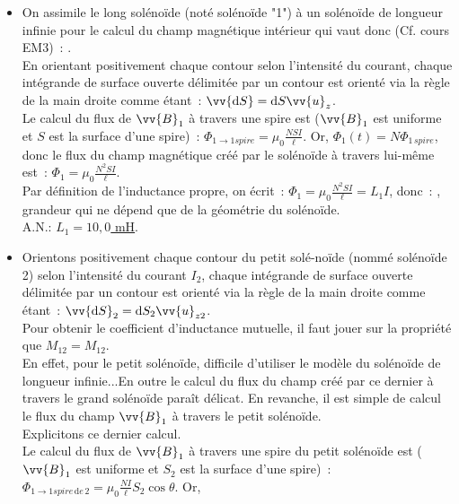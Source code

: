 \documentclass{article}
\renewcommand\overrightarrow{\vv}
\begin{document}
\begin{itemize}
\item On assimile le long solénoïde (noté solénoïde "1") à un
solénoïde de longueur infinie pour le calcul du champ magnétique
intérieur qui vaut donc (Cf. cours EM3) :
\fbox{$\overrightarrow{B}_{1} = \mu_{0}\frac{ N
I}{\ell}\overrightarrow{u}_{z}$}. \\
En orientant positivement chaque contour selon l'intensité du
courant, chaque intégrande de surface ouverte délimitée par un
contour est orienté via la règle de la main droite comme étant :
$\overrightarrow{\mathrm{d}S} =\mathrm{d}S\overrightarrow{u}_{z}$. \\
Le calcul du flux de $\overrightarrow{B}_{1}$ à travers une spire
est  ($\overrightarrow{B}_{1}$ est uniforme et $S$ est la surface
d'une spire) : $\Phi_{1\longrightarrow 1 spire} =
\mu_{0}\frac{NSI}{\ell}$. Or, $\Phi_{1}\left(t\right) = N\Phi_{1\,spire}$, donc
le flux du champ magnétique créé par le solénoïde à travers lui-même
est : $\Phi_{1} = \mu_{0}\frac{N^{2}SI}{\ell}$.\\
Par définition de l'inductance propre, on écrit : $\Phi_{1}=
\mu_{0}\frac{N^{2}SI}{\ell} = L_{1}I$, donc : , grandeur qui ne dépend que de la
géométrie du solénoïde. \\
A.N.: \underline{$L_{1} = 10,0$ mH}.
\item Orientons positivement chaque contour du petit solé-noïde (nommé solénoïde 2) selon l'intensité du courant $I_{2}$,
chaque intégrande de surface ouverte délimitée par un contour est
orienté via la règle de la main droite comme étant :
$\overrightarrow{\mathrm{d}S}_{2} =\mathrm{d}S_{2}\overrightarrow{u}_{z2}$. \\
Pour obtenir le coefficient d'inductance mutuelle, il faut jouer sur
la propriété que $M_{12} = M_{12}$. \\
En effet, pour le petit solénoïde, difficile d'utiliser le modèle du
solénoïde de longueur infinie...En outre le calcul du flux du champ
créé par ce dernier à travers le grand solénoïde paraît délicat. En
revanche, il est simple de calcul le flux du champ
$\overrightarrow{B}_{1}$ à travers le petit solénoïde. \\
Explicitons ce dernier calcul. \\
Le calcul du flux de $\overrightarrow{B}_{1}$ à travers une spire du
petit solénoïde est  ($\overrightarrow{B}_{1}$ est uniforme et
$S_{2}$ est la surface d'une spire) : $\Phi_{1\longrightarrow 1
spire\, \mathrm{d}e\,2} = \mu_{0}\frac{NI}{\ell}S_{2}\cos\theta$. Or,

\end{itemize}
\end{document}
